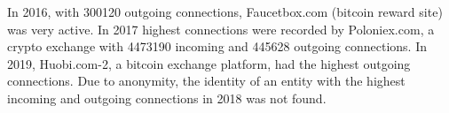 \documentclass[preprint,12pt]{elsarticle}
\begin{document}
In 2016, with 300120 outgoing connections, Faucetbox.com (bitcoin reward site) was very active. In 2017 highest connections were recorded by Poloniex.com, a crypto exchange with 4473190 incoming and 445628 outgoing connections. In 2019, Huobi.com-2, a bitcoin exchange platform, had the highest outgoing connections. Due to anonymity, the identity of an entity with the highest incoming and outgoing connections in 2018 was not found. 


\begin{table}[H]
\centering
\caption{Global network properties (2016-2020)}
\label{glob2}
\end{table}
\end{document}

